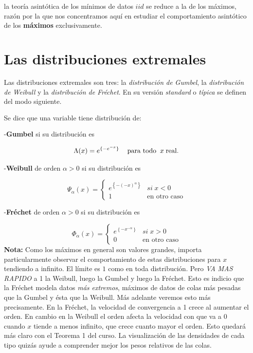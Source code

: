 \documentclass[
]{book}
\theoremstyle{definition}
\theoremstyle{definition}
\theoremstyle{definition}
\theoremstyle{definition}
\theoremstyle{remark}
\begin{document}
la teoría asintótica de los mínimos de datos \(iid\)
se reduce a la de los máximos, razón por la que
nos concentramos aquí en estudiar el
comportamiento asintótico de los \textbf{máximos}
exclusivamente.

\section{Las distribuciones extremales}\label{las-distribuciones-extremales}

Las distribuciones extremales son tres: la
\emph{distribución de Gumbel}, la \emph{distribución de Weibull} y
la \emph{distribución de Fréchet}. En su versión \emph{standard} o \emph{típica} se definen del modo
siguiente.

Se dice que una variable tiene distribución de:

-\textbf{Gumbel} si su distribución es

\[\Lambda(x) = e^{\{-e^{-x}\}}\hspace{0.3cm}\text{ para todo }\: x \;\text{real}.\]

-\textbf{Weibull} de orden \(\alpha>0\) si su distribución es

\[\Psi_{\alpha}(x)=\begin{cases}
e^{\left\{-(-x)^{\alpha}  \right\}} & si\;x<0\\
1 & \text{en otro caso}
\end{cases}\]

-\textbf{Fréchet} de orden \(\alpha>0\) si su distribución es

\[
\Phi_{\alpha}(x)=\begin{cases}
e^{\left\{ -x^{-\alpha}\right\}} & si\;x>0\\
0 & \text{en otro caso}
\end{cases}
\]
\textbf{Nota:} Como los máximos en general son valores grandes,
importa particularmente observar el comportamiento de estas distribuciones para \(x\) tendiendo a infinito. El límite es \(1\) como en toda distribución. Pero \emph{VA MAS RAPIDO} a 1 la Weibull, luego la Gumbel y luego la Fréchet. Esto es indicio que la
Fréchet modela datos \emph{más extremos}, máximos de datos de
colas más pesadas que la Gumbel y ésta que la Weibull. Más
adelante veremos esto más precisamente. En la Fréchet, la
velocidad de convergencia a 1 crece al aumentar el orden. En cambio en la Weibull el orden afecta la velocidad con que va a 0 cuando \(x\) tiende a menos infinito, que crece cuanto mayor el orden. Esto quedará más claro con el Teorema 1 del curso. La visualización de las densidades de cada tipo quizás ayude a comprender mejor los pesos relativos de las colas.
\end{document}
